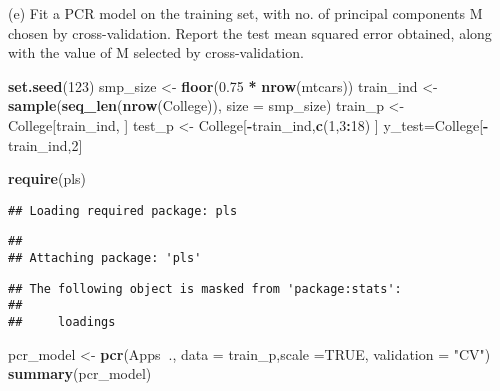 \documentclass[
  ignorenonframetext,
]{beamer}
\newenvironment{Shaded}{\begin{snugshade}}{\end{snugshade}}
\newcommand{\DataTypeTok}[1]{\textcolor[rgb]{0.13,0.29,0.53}{#1}}
\newcommand{\DecValTok}[1]{\textcolor[rgb]{0.00,0.00,0.81}{#1}}
\newcommand{\FloatTok}[1]{\textcolor[rgb]{0.00,0.00,0.81}{#1}}
\newcommand{\KeywordTok}[1]{\textcolor[rgb]{0.13,0.29,0.53}{\textbf{#1}}}
\newcommand{\NormalTok}[1]{#1}
\newcommand{\OperatorTok}[1]{\textcolor[rgb]{0.81,0.36,0.00}{\textbf{#1}}}
\newcommand{\OtherTok}[1]{\textcolor[rgb]{0.56,0.35,0.01}{#1}}
\newcommand{\StringTok}[1]{\textcolor[rgb]{0.31,0.60,0.02}{#1}}
\begin{document}
\begin{frame}[fragile]{(e) Fit a PCR model on the training set, with no.
of principal components M chosen by cross-validation. Report the test
mean squared error obtained, along with the value of M selected by
cross-validation.}
\protect\hypertarget{e-fit-a-pcr-model-on-the-training-set-with-no.-of-principal-components-m-chosen-by-cross-validation.-report-the-test-mean-squared-error-obtained-along-with-the-value-of-m-selected-by-cross-validation.}{}

\begin{Shaded}
\begin{Highlighting}[]
\KeywordTok{set.seed}\NormalTok{(}\DecValTok{123}\NormalTok{)}
\NormalTok{smp_size <-}\StringTok{ }\KeywordTok{floor}\NormalTok{(}\FloatTok{0.75} \OperatorTok{*}\StringTok{ }\KeywordTok{nrow}\NormalTok{(mtcars))}
\NormalTok{train_ind <-}\StringTok{ }\KeywordTok{sample}\NormalTok{(}\KeywordTok{seq_len}\NormalTok{(}\KeywordTok{nrow}\NormalTok{(College)), }\DataTypeTok{size =}\NormalTok{ smp_size)}
\NormalTok{train_p <-}\StringTok{ }\NormalTok{College[train_ind, ]}
\NormalTok{test_p <-}\StringTok{ }\NormalTok{College[}\OperatorTok{-}\NormalTok{train_ind,}\KeywordTok{c}\NormalTok{(}\DecValTok{1}\NormalTok{,}\DecValTok{3}\OperatorTok{:}\DecValTok{18}\NormalTok{) ]}
\NormalTok{y_test=College[}\OperatorTok{-}\NormalTok{train_ind,}\DecValTok{2}\NormalTok{]}

\KeywordTok{require}\NormalTok{(pls)}
\end{Highlighting}
\end{Shaded}

\begin{verbatim}
## Loading required package: pls
\end{verbatim}

\begin{verbatim}
## 
## Attaching package: 'pls'
\end{verbatim}

\begin{verbatim}
## The following object is masked from 'package:stats':
## 
##     loadings
\end{verbatim}

\begin{Shaded}
\begin{Highlighting}[]
\NormalTok{pcr_model <-}\StringTok{ }\KeywordTok{pcr}\NormalTok{(Apps}\OperatorTok{~}\NormalTok{., }\DataTypeTok{data =}\NormalTok{ train_p,}\DataTypeTok{scale =}\OtherTok{TRUE}\NormalTok{, }\DataTypeTok{validation =} \StringTok{"CV"}\NormalTok{)}
\KeywordTok{summary}\NormalTok{(pcr_model)}
\end{Highlighting}
\end{Shaded}


\end{frame}
\end{document}
